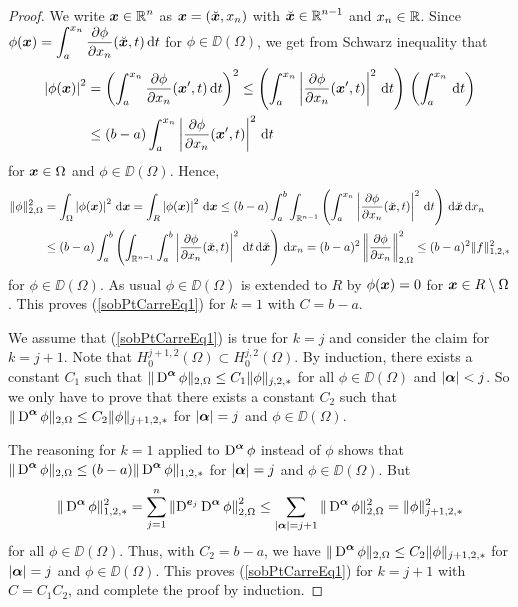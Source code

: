 \begin{proof}
We write $\displaystyle {\bm{x}}\in \mathbb{R}^n$ as
${\bm{x}} = (\breve{{\bm{x}}}, x_n)$ with
$\displaystyle \breve{{\bm{x}}} \in \mathbb{R}^{n-1}$ and $x_n \in \mathbb{R}$.  Since
$\displaystyle \phi({\bm{x}})
= \int_a^{x_n} \frac{\partial{\phi}}{\partial x_n}(\breve{{\bm{x}}}, t) \,\mathrm{d}{t}$
for $\phi \in \DD(\Omega)$, we get from Schwarz inequality that
\begin{align*}
\left|\phi({\bm{x}})\right|^2 &= \left( \int_a^{x_n}
\frac{\partial{\phi}}{\partial x_n} ({\bm{x}}',t) \,\mathrm{d}{t} \right)^2 
\leq \left(\int_a^{x_n}
\left| \frac{\partial{\phi}}{\partial x_n} ({\bm{x}}',t)\right|^2 \,\mathrm{d}{t}\right)\,
\left( \int_a^{x_n} \,\mathrm{d}{t}\right) \\
&\leq (b-a) \int_a^{x_n} \left| \frac{\partial{\phi}}{\partial x_n} ({\bm{x}}',t)\right|^2 \,\mathrm{d}{t}
\end{align*}
for ${\bm{x}} \in \Omega$ and $\phi \in \DD(\Omega)$.  Hence,
\begin{align*}
\|\phi\|_{2,\Omega}^2 &= \int_\Omega \left|\phi({\bm{x}})\right|^2\,\mathrm{d}{{\bm{x}}} 
= \int_R \left|\phi({\bm{x}})\right|^2\,\mathrm{d}{{\bm{x}}}
\leq (b-a) \int_a^b \int_{\mathbb{R}^{n-1}} \left(
\int_a^{x_n} \left| \frac{\partial{\phi}}{\partial x_n} (\breve{{\bm{x}}},t)\right|^2 \,\mathrm{d}{t}\right)
\,\mathrm{d}{\breve{{\bm{x}}}} \,\mathrm{d}{x_n} \\
& \leq (b-a) \int_a^b \left( \int_{\mathbb{R}^{n-1}}
\int_a^b \left| \frac{\partial{\phi}}{\partial x_n} (\breve{{\bm{x}}},t)\right|^2 \,\mathrm{d}{t}
\,\mathrm{d}{\breve{{\bm{x}}}} \right) \,\mathrm{d}{x_n}
= (b-a)^2 \left\| \frac{\partial{\phi}}{\partial x_n} \right\|_{2,\Omega}^2 \leq (b-a)^2
\| f \|_{1,2,\ast}^2
\end{align*}
for $\phi \in \DD(\Omega)$.  As usual $\phi \in \DD(\Omega)$ is
extended to $R$ by $\phi({\bm{x}}) = 0$ for ${\bm{x}} \in R \setminus \Omega$.
This proves (\ref{sobPtCarreEq1}) for $k=1$ with $C=b-a$.

We assume that (\ref{sobPtCarreEq1}) is true for $k=j$ and consider the claim
for $k=j+1$.  Note that
$\displaystyle H^{j+1,2}_0(\Omega) \subset H^{j,2}_0(\Omega)$.
By induction, there exists a constant $C_1$ such that
$\displaystyle \| \operatorname{D}^{{\bm{\alpha}}} \phi \|_{2,\Omega}
\leq C_1 \|\phi\|_{j,2,\ast}$ for 
all $\phi \in \DD(\Omega)$ and $|{\bm{\alpha}}| < j$.  So we only have
to prove that there exists a constant $C_2$ such that
$\displaystyle \| \operatorname{D}^{{\bm{\alpha}}} \phi \|_{2,\Omega}
\leq C_2 \|\phi\|_{j+1,2,\ast}$ for
$|{\bm{\alpha}}|=j$ and $\phi \in \DD(\Omega)$.

The reasoning for $k=1$ applied to $\displaystyle \operatorname{D}^{{\bm{\alpha}}} \phi$
instead of $\phi$ shows
that $\displaystyle \|\operatorname{D}^{{\bm{\alpha}}} \phi\|_{2,\Omega} \leq
(b-a) \| \operatorname{D}^{{\bm{\alpha}}} \phi \|_{1,2,\ast}$
for $|{\bm{\alpha}}|=j$ and $\phi \in \DD(\Omega)$.  But
\[
\| \operatorname{D}^{{\bm{\alpha}}} \phi \|_{1,2,\ast}^2 = 
\sum_{j=1}^n \left\| \operatorname{D}^{{\bm{e}}_j} \operatorname{D}^{{\bm{\alpha}}}
\phi \right\|_{2,\Omega}^2 \leq
\sum_{|{\bm{\alpha}}|=j+1} \| \operatorname{D}^{{\bm{\alpha}}} \phi \|_{2,\Omega}^2
= \|\phi\|_{j+1,2,\ast}^2
\]
for all $\phi \in \DD(\Omega)$.  Thus, with $C_2=b-a$, we have
$\displaystyle \| \operatorname{D}^{{\bm{\alpha}}} \phi \|_{2,\Omega}
\leq C_2 \|\phi\|_{j+1,2,\ast}$ for
$|{\bm{\alpha}}|=j$ and $\phi \in \DD(\Omega)$.
This proves (\ref{sobPtCarreEq1}) for $k=j+1$ with $C=C_1 C_2$, and
complete the proof by induction.
\end{proof}

